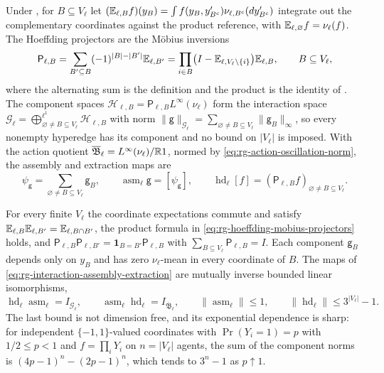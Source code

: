 Under , for $B\subseteq V_\ell$ let
$(\mathbb E_{\ell,B}f)(y_B)=\int f(y_B,y'_{B^c})\nu_{\ell,B^c}(dy'_{B^c})$ integrate
out the complementary coordinates against the product reference, with
$\mathbb E_{\ell,\varnothing}f=\nu_\ell(f)$. The Hoeffding projectors are the
M\"obius inversions
\begin{equation}
\mathsf P_{\ell,B}
=\sum_{B'\subseteq B}(-1)^{\lvert B\rvert-\lvert B'\rvert}\mathbb E_{\ell,B'}
=\prod_{i\in B}\bigl(I-\mathbb E_{\ell,V_\ell\setminus\{i\}}\bigr)\mathbb E_{\ell,B},
\qquad B\subseteq V_\ell,
\label{eq:rg-hoeffding-mobius-projectors}
\end{equation}
where the alternating sum is the definition and the product is the identity of
. The component spaces
$\mathcal H_{\ell,B}=\mathsf P_{\ell,B}L^\infty(\nu_\ell)$ form the interaction
space $\mathcal G_\ell=\bigoplus^{\ell^1}_{\varnothing\ne B\subseteq
V_\ell}\mathcal H_{\ell,B}$ with norm $\lVert\mathsf g\rVert_{\mathcal
G_\ell}=\sum_{\varnothing\ne B\subseteq V_\ell}\lVert\mathsf g_B\rVert_\infty$, so
every nonempty hyperedge has its component and no bound on $\lvert V_\ell\rvert$
is imposed. With the action quotient
$\overline{\mathfrak B}_\ell=L^\infty(\nu_\ell)/\mathbb R1$, normed by
\eqref{eq:rg-action-oscillation-norm}, the assembly and extraction maps are
\begin{equation}
\psi_{\mathsf g}=\sum_{\varnothing\ne B\subseteq V_\ell}\mathsf g_B,
\qquad
\operatorname{asm}_\ell\mathsf g=[\psi_{\mathsf g}],
\qquad
\operatorname{hd}_\ell[f]=(\mathsf P_{\ell,B}f)_{\varnothing\ne B\subseteq V_\ell}.
\label{eq:rg-interaction-assembly-extraction}
\end{equation}

For every finite $V_\ell$ the coordinate expectations commute and satisfy
$\mathbb E_{\ell,B}\mathbb E_{\ell,B'}=\mathbb E_{\ell,B\cap B'}$, the product formula
in \eqref{eq:rg-hoeffding-mobius-projectors} holds, and
$\mathsf P_{\ell,B}\mathsf P_{\ell,B'}=\mathbf 1_{B=B'}\mathsf P_{\ell,B}$ with
$\sum_{B\subseteq V_\ell}\mathsf P_{\ell,B}=I$. Each component $\mathsf g_B$
depends only on $y_B$ and has zero $\nu_\ell$-mean in every coordinate of $B$. The
maps of \eqref{eq:rg-interaction-assembly-extraction} are mutually inverse bounded
linear isomorphisms,
\begin{equation}
\operatorname{hd}_\ell\operatorname{asm}_\ell=I_{\mathcal G_\ell},
\qquad
\operatorname{asm}_\ell\operatorname{hd}_\ell=I_{\overline{\mathfrak B}_\ell},
\qquad
\lVert\operatorname{asm}_\ell\rVert\le1,
\qquad
\lVert\operatorname{hd}_\ell\rVert\le3^{\lvert V_\ell\rvert}-1 .
\label{eq:rg-hoeffding-inverse-and-bounds}
\end{equation}
The last bound is not dimension free, and its exponential dependence is sharp: for independent $\{-1,1\}$-valued coordinates with
$\Pr(Y_i=1)=p$ with $1/2\leq p<1$ and $f=\prod_iY_i$ on $n=\lvert V_\ell\rvert$ agents, the sum of
the component norms is $(4p-1)^n-(2p-1)^n$, which tends to $3^n-1$ as $p\uparrow1$.

